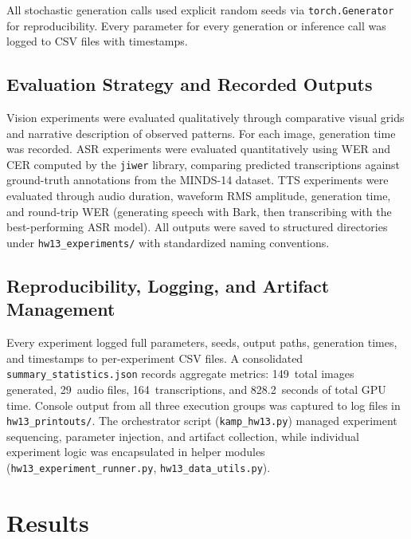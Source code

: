 \documentclass[conference]{IEEEtran}
\begin{document}
All stochastic generation calls used explicit random seeds via \texttt{torch.Generator} for reproducibility. Every parameter for every generation or inference call was logged to CSV files with timestamps.

\subsection{Evaluation Strategy and Recorded Outputs}

Vision experiments were evaluated qualitatively through comparative visual grids and narrative description of observed patterns. For each image, generation time was recorded. ASR experiments were evaluated quantitatively using WER and CER computed by the \texttt{jiwer} library, comparing predicted transcriptions against ground-truth annotations from the MINDS-14 dataset. TTS experiments were evaluated through audio duration, waveform RMS amplitude, generation time, and round-trip WER (generating speech with Bark, then transcribing with the best-performing ASR model). All outputs were saved to structured directories under \texttt{hw13\_experiments/} with standardized naming conventions.

\subsection{Reproducibility, Logging, and Artifact Management}

Every experiment logged full parameters, seeds, output paths, generation times, and timestamps to per-experiment CSV files. A consolidated \texttt{summary\_statistics.json} records aggregate metrics: 149~total images generated, 29~audio files, 164~transcriptions, and 828.2~seconds of total GPU time. Console output from all three execution groups was captured to log files in \texttt{hw13\_printouts/}. The orchestrator script (\texttt{kamp\_hw13.py}) managed experiment sequencing, parameter injection, and artifact collection, while individual experiment logic was encapsulated in helper modules (\texttt{hw13\_experiment\_runner.py}, \texttt{hw13\_data\_utils.py}).

\section{Results}
\label{sec:results}
\end{document}
